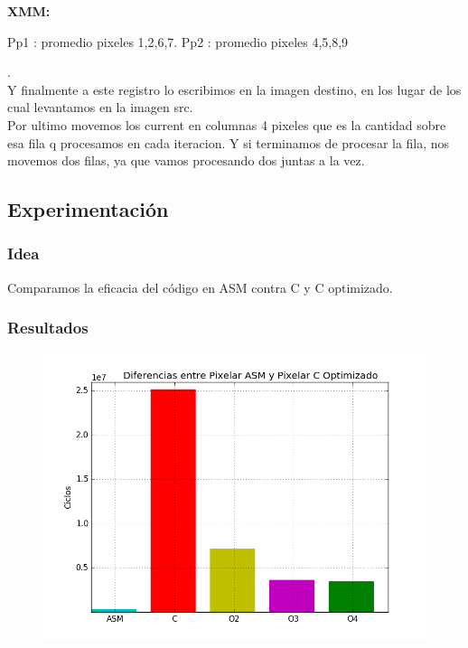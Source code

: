 \par{\textbf{XMM:}}
\par {Pp1 : promedio pixeles {1,2,6,7}. Pp2 : promedio pixeles {4,5,8,9}}
	
	
.\\ Y finalmente a este registro lo escribimos en la imagen destino, en los lugar de los cual levantamos en la imagen src. \\ Por ultimo movemos los current en columnas 4 pixeles que es la cantidad sobre esa fila q procesamos en cada iteracion. Y si terminamos de procesar la fila, nos movemos dos filas, ya que vamos procesando dos juntas a la vez.
	
\subsection{Experimentación}
\subsubsection{Idea}	
	Comparamos la eficacia del código en ASM contra C y C optimizado.
	
\subsubsection{Resultados}
	\begin{figure}[h!]
	\includegraphics[width = 15 cm, height = 10 cm]{imagenes/ASMvsCPixelar.png}
\end{figure}